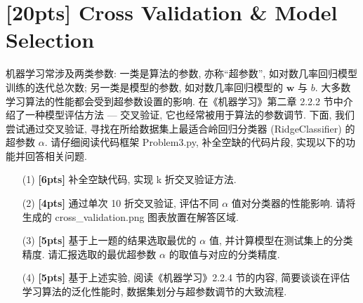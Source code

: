 \documentclass[a4paper,UTF8]{article}
\numberwithin{equation}{section}
\theoremstyle{definition}
\begin{document}
\section{[20pts] Cross Validation \& Model Selection}
机器学习常涉及两类参数: 一类是算法的参数, 亦称``超参数'', 如对数几率回归模型训练的迭代总次数; 另一类是模型的参数, 如对数几率回归模型的 $\mathbf{w}$ 与 $b$. 大多数学习算法的性能都会受到超参数设置的影响. 在《机器学习》第二章 2.2.2 节中介绍了一种模型评估方法 --- 交叉验证, 它也经常被用于算法的参数调节. 下面, 我们尝试通过交叉验证, 寻找在所给数据集上最适合岭回归分类器 (RidgeClassifier) 的超参数 $\alpha$. 请仔细阅读代码框架 Problem3.py, 补全空缺的代码片段, 实现以下的功能并回答相关问题.
\begin{enumerate}
    \item [(1)] \textbf{[6pts]} 补全空缺代码, 实现 k 折交叉验证方法.
    \item [(2)] \textbf{[4pts]} 通过单次 10 折交叉验证, 评估不同 $\alpha$ 值对分类器的性能影响. 请将生成的 cross\_validation.png 图表放置在解答区域.
    \item [(3)] \textbf{[5pts]} 基于上一题的结果选取最优的 $\alpha$ 值, 并计算模型在测试集上的分类精度. 请汇报选取的最优超参数 $\alpha$ 的取值与对应的分类精度.
    \item [(4)] \textbf{[5pts]} 基于上述实验, 阅读《机器学习》2.2.4 节的内容, 简要谈谈在评估学习算法的泛化性能时, 数据集划分与超参数调节的大致流程.
\end{enumerate}
\end{document}
